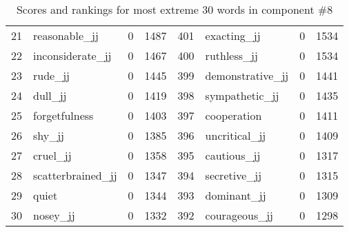 \begin{table}[tbp]
\begin{tabular}{| rlr@{.}l | rlr@{.}l |}
    21 & reasonable\_jj & 0 & 1487    &    401 & exacting\_jj & 0 & 1534 \\
    22 & inconsiderate\_jj & 0 & 1467    &    400 & ruthless\_jj & 0 & 1534 \\
    23 & rude\_jj & 0 & 1445    &    399 & demonstrative\_jj & 0 & 1441 \\
    24 & dull\_jj & 0 & 1419    &    398 & sympathetic\_jj & 0 & 1435 \\
    25 & forgetfulness & 0 & 1403    &    397 & cooperation & 0 & 1411 \\
    26 & shy\_jj & 0 & 1385    &    396 & uncritical\_jj & 0 & 1409 \\
    27 & cruel\_jj & 0 & 1358    &    395 & cautious\_jj & 0 & 1317 \\
    28 & scatterbrained\_jj & 0 & 1347    &    394 & secretive\_jj & 0 & 1315 \\
    29 & quiet & 0 & 1344    &    393 & dominant\_jj & 0 & 1309 \\
    30 & nosey\_jj & 0 & 1332    &    392 & courageous\_jj & 0 & 1298 \\
    \hline
    \end{tabular}
    \caption{Scores and rankings for most extreme 30 words in component \#8} 
\end{table}
\clearpage
